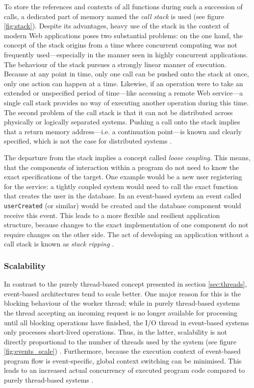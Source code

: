 To store the references and contexts of all functions during such a succession of calls, a dedicated part of memory named the \textit{call stack} is used (see figure \ref{fig:stack}). Despite its advantages, heavy use of the stack in the context of modern Web applications poses two substantial problems: on the one hand, the concept of the stack origins from a time where concurrent computing was not frequently used---especially in the manner seen in highly concurrent applications. The behaviour of the stack pursues a strongly linear manner of execution. Because at any point in time, only one call can be pushed onto the stack at once, only one action can happen at a time. Likewise, if an operation were to take an extended or unspecified period of time---like accessing a remote Web service---a single call stack provides no way of executing another operation during this time. The second problem of the call stack is that it can not be distributed across physically or logically separated systems. Pushing a call onto the stack implies that a return memory address---i.e. a continuation point---is known and clearly specified, which is not the case for distributed systems \cite{Hohpe2006}.

The departure from the stack implies a concept called \textit{loose coupling}. This means, that the components of interaction within a program do not need to know the exact specifications of the target. One example would be a new user registering for the service: a tightly coupled system would need to call the exact function that creates the user in the database. In an event-based system an event called \texttt{userCreated} (or similar) would be created and the database component would receive this event. This leads to a more flexible and resilient application structure, because changes to the exact implementation of one component do not require changes on the other side. The act of developing an application without a call stack is known as \textit{stack ripping} \cite{Drolia2010}.

\subsubsection*{Scalability}
In contrast to the purely thread-based concept presented in section \ref{sec:threads}, event-based architectures tend to scale better. One major reason for this is the blocking behaviour of the worker thread; while in purely thread-based systems the thread accepting an incoming request is no longer available for processing until all blocking operations have finished, the I/O thread in event-based systems only processes short-lived operations. Thus, in the latter, scalability is not directly proportional to the number of threads used by the system (see figure \ref{fig:events_scale}) \cite[p. 2]{Carrera}. Furthermore, because the execution context of event-based program flow is event-specific, global context switching can be minimised. This leads to an increased actual concurrency of executed program code compared to purely thread-based systems \cite{Lee2006}.

